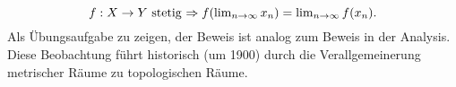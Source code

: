 \begin{remark}
  \begin{equation*}
    f: X \to Y $ stetig $ \Rightarrow f(\lim_{n \to \infty}x_n) = \lim_{n \to \infty}f(x_n)\text{.}
  \end{equation*}
  Als Übungsaufgabe zu zeigen, der Beweis ist analog zum Beweis in der Analysis. \\
  Diese Beobachtung führt historisch (um 1900) durch die Verallgemeinerung metrischer Räume zu topologischen Räume.
\end{remark}